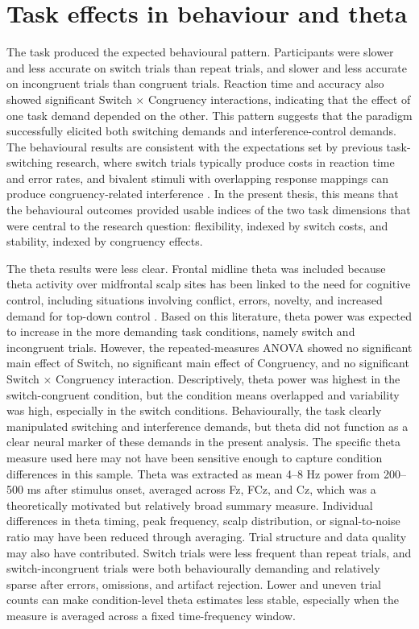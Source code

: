 \documentclass[12pt,a4paper]{report}
\begin{document}
\section{Task effects in behaviour and theta}

The task produced the expected behavioural pattern. Participants were slower and less accurate on switch trials than repeat trials, and slower and less accurate on incongruent trials than congruent trials. Reaction time and accuracy also showed significant Switch × Congruency interactions, indicating that the effect of one task demand depended on the other. This pattern suggests that the paradigm successfully elicited both switching demands and interference-control demands. The behavioural results are consistent with the expectations set by previous task-switching research, where switch trials typically produce costs in reaction time and error rates, and bivalent stimuli with overlapping response mappings can produce congruency-related interference \parencite{rogers1995taskswitch,kiesel2010review}. In the present thesis, this means that the behavioural outcomes provided usable indices of the two task dimensions that were central to the research question: flexibility, indexed by switch costs, and stability, indexed by congruency effects.

The theta results were less clear. Frontal midline theta was included because theta activity over midfrontal scalp sites has been linked to the need for cognitive control, including situations involving conflict, errors, novelty, and increased demand for top-down control \parencite{cavanagh2014theta,cavanagh2015metatheta}. Based on this literature, theta power was expected to increase in the more demanding task conditions, namely switch and incongruent trials. However, the repeated-measures ANOVA showed no significant main effect of Switch, no significant main effect of Congruency, and no significant Switch × Congruency interaction. Descriptively, theta power was highest in the switch-congruent condition, but the condition means overlapped and variability was high, especially in the switch conditions. Behaviourally, the task clearly manipulated switching and interference demands, but theta did not function as a clear neural marker of these demands in the present analysis. The specific theta measure used here may not have been sensitive enough to capture condition differences in this sample. Theta was extracted as mean 4--8 Hz power from 200--500 ms after stimulus onset, averaged across Fz, FCz, and Cz, which was a theoretically motivated but relatively broad summary measure. Individual differences in theta timing, peak frequency, scalp distribution, or signal-to-noise ratio may have been reduced through averaging. Trial structure and data quality may also have contributed. Switch trials were less frequent than repeat trials, and switch-incongruent trials were both behaviourally demanding and relatively sparse after errors, omissions, and artifact rejection. Lower and uneven trial counts can make condition-level theta estimates less stable, especially when the measure is averaged across a fixed time-frequency window.
\end{document}
